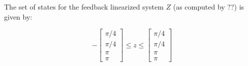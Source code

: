 The set of states for the feedback linearized system $Z$ (as computed by ??) is given by:

\begin{equation}
 -\begin{bmatrix} \pi/4  \\ \pi/4  \\ \pi \\ \pi \end{bmatrix} \leq z \leq \begin{bmatrix} \pi/4  \\ \pi/4  \\ \pi \\ \pi \end{bmatrix}
\end{equation}